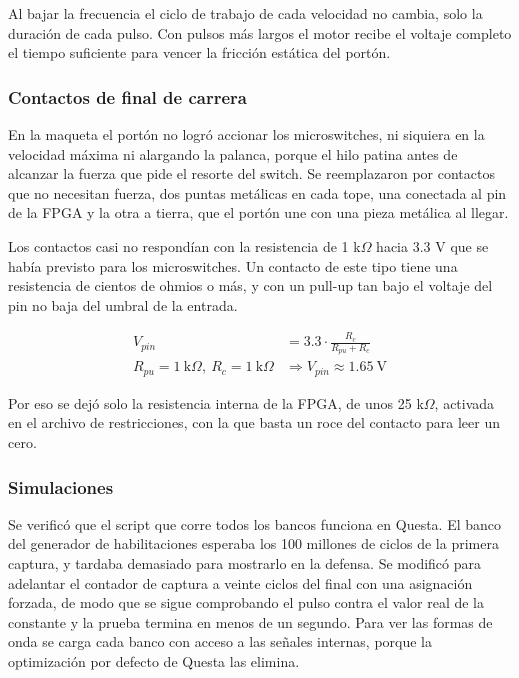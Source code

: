 \documentclass[11pt,letterpaper]{article}
\begin{document}
Al bajar la frecuencia el ciclo de trabajo de cada velocidad no cambia, solo la duración de cada pulso. Con pulsos más largos el motor recibe el voltaje completo el tiempo suficiente para vencer la fricción estática del portón.

\subsubsection*{Contactos de final de carrera}

En la maqueta el portón no logró accionar los microswitches, ni siquiera en la velocidad máxima ni alargando la palanca, porque el hilo patina antes de alcanzar la fuerza que pide el resorte del switch. Se reemplazaron por contactos que no necesitan fuerza, dos puntas metálicas en cada tope, una conectada al pin de la FPGA y la otra a tierra, que el portón une con una pieza metálica al llegar.

Los contactos casi no respondían con la resistencia de 1 k$\Omega$ hacia 3.3 V que se había previsto para los microswitches. Un contacto de este tipo tiene una resistencia de cientos de ohmios o más, y con un pull-up tan bajo el voltaje del pin no baja del umbral de la entrada.

\begin{align*}
V_{pin} &= 3.3 \cdot \frac{R_c}{R_{pu} + R_c} \\
R_{pu} = 1\ \text{k}\Omega,\ R_c = 1\ \text{k}\Omega &\Rightarrow V_{pin} \approx 1.65\ \text{V}
\end{align*}

Por eso se dejó solo la resistencia interna de la FPGA, de unos 25 k$\Omega$, activada en el archivo de restricciones, con la que basta un roce del contacto para leer un cero.

\subsubsection*{Simulaciones}

Se verificó que el script que corre todos los bancos funciona en Questa. El banco del generador de habilitaciones esperaba los 100 millones de ciclos de la primera captura, y tardaba demasiado para mostrarlo en la defensa. Se modificó para adelantar el contador de captura a veinte ciclos del final con una asignación forzada, de modo que se sigue comprobando el pulso contra el valor real de la constante y la prueba termina en menos de un segundo. Para ver las formas de onda se carga cada banco con acceso a las señales internas, porque la optimización por defecto de Questa las elimina.
\end{document}
